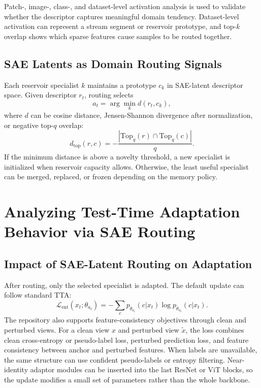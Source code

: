 \documentclass{article}
\begin{document}
Patch-, image-, class-, and dataset-level activation analysis is used to validate whether the descriptor captures meaningful domain tendency. Dataset-level activation can represent a stream segment or reservoir prototype, and top-$k$ overlap shows which sparse features cause samples to be routed together.

\subsection{SAE Latents as Domain Routing Signals}

Each reservoir specialist $k$ maintains a prototype $c_k$ in SAE-latent descriptor space. Given descriptor $r_t$, routing selects
\begin{equation}
a_t = \arg\min_k d(r_t,c_k),
\end{equation}
where $d$ can be cosine distance, Jensen-Shannon divergence after normalization, or negative top-$q$ overlap:
\begin{equation}
d_{\mathrm{top}}(r,c) = -\frac{|\mathrm{Top}_q(r)\cap \mathrm{Top}_q(c)|}{q}.
\end{equation}
If the minimum distance is above a novelty threshold, a new specialist is initialized when reservoir capacity allows. Otherwise, the least useful specialist can be merged, replaced, or frozen depending on the memory policy.

\section{Analyzing Test-Time Adaptation Behavior via SAE Routing}

\subsection{Impact of SAE-Latent Routing on Adaptation}

After routing, only the selected specialist is adapted. The default update can follow standard TTA:
\begin{equation}
\mathcal{L}_{\mathrm{ent}}(x_t;\theta_{a_t})
= -\sum_c p_{\theta_{a_t}}(c|x_t)\log p_{\theta_{a_t}}(c|x_t).
\end{equation}
The repository also supports feature-consistency objectives through clean and perturbed views. For a clean view $x$ and perturbed view $\tilde{x}$, the loss combines clean cross-entropy or pseudo-label loss, perturbed prediction loss, and feature consistency between anchor and perturbed features. When labels are unavailable, the same structure can use confident pseudo-labels or entropy filtering. Near-identity adaptor modules can be inserted into the last ResNet or ViT blocks, so the update modifies a small set of parameters rather than the whole backbone.
\end{document}
